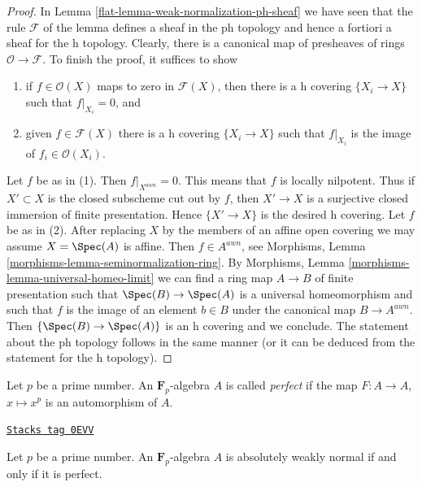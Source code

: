 \begin{proof}

In Lemma \ref{flat-lemma-weak-normalization-ph-sheaf}
we have seen that the rule $\mathcal{F}$ of the lemma
defines a sheaf in the ph topology and hence a fortiori
a sheaf for the h topology. Clearly, there is a canonical map
of presheaves of rings $\mathcal{O} \to \mathcal{F}$.
To finish the proof, it suffices to show
\begin{enumerate}
\item if $f \in \mathcal{O}(X)$ maps to zero in $\mathcal{F}(X)$,
then there is a h covering $\{X_i \to X\}$ such that $f|_{X_i} = 0$, and
\item given $f \in \mathcal{F}(X)$ there is a h covering
$\{X_i \to X\}$ such that $f|_{X_i}$ is the image of $f_i \in \mathcal{O}(X_i)$.
\end{enumerate}
Let $f$ be as in (1). Then $f|_{X^{awn}} = 0$. This means that $f$
is locally nilpotent. Thus if $X' \subset X$ is the closed subscheme
cut out by $f$, then $X' \to X$ is a surjective closed immersion of
finite presentation. Hence $\{X' \to X\}$ is the desired h covering.
Let $f$ be as in (2). After replacing $X$ by the members of an
affine open covering we may assume $X = \Spec(A)$ is affine.
Then $f \in A^{awn}$, see
Morphisms, Lemma \ref{morphisms-lemma-seminormalization-ring}.
By Morphisms, Lemma \ref{morphisms-lemma-universal-homeo-limit}
we can find a ring map $A \to B$ of finite presentation
such that $\Spec(B) \to \Spec(A)$ is a universal homeomorphism
and such that $f$ is the image of an element $b \in B$ under
the canonical map $B \to A^{awn}$. Then
$\{\Spec(B) \to \Spec(A)\}$ is an h covering and we conclude.
The statement about the ph topology follows in the same manner
(or it can be deduced from the statement for the h topology).
\end{proof}

Let $p$ be a prime number. An $\mathbf{F}_p$-algebra $A$ is
called {\it perfect} if the map $F : A \to A$, $x \mapsto x^p$
is an automorphism of $A$.

\begin{lemma}
\label{flat-lemma-perfect-weankly-normal}
\href{https://stacks.math.columbia.edu/tag/0EVV}{\texttt{Stacks tag 0EVV}}

Let $p$ be a prime number. An $\mathbf{F}_p$-algebra $A$ is
absolutely weakly normal if and only if it is perfect.
\end{lemma}

